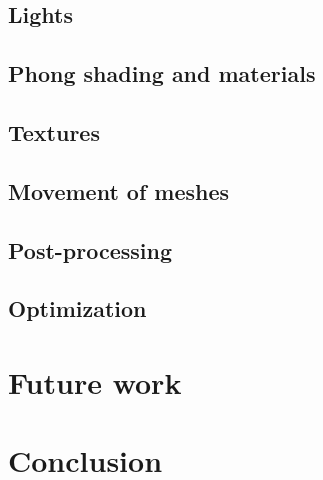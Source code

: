 \documentclass[10pt, a4paper]{article}
\begin{document}
\subsection{Lights}

\subsection{Phong shading and materials}

\subsection{Textures}

\subsection{Movement of meshes}

\subsection{Post-processing}

\subsection{Optimization}

\section{Future work}
	
\section{Conclusion}	


		
\end{document}
